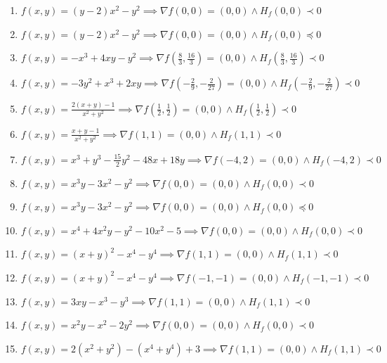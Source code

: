 \documentclass[11pt,a4paper]{article}
\begin{document}
\begin{enumerate}
\item $\displaystyle f(x, y) = (y - 2) x^{2} - y^{2} \implies \nabla f(0, 0) = (0, 0) \land H_{f}(0, 0) \prec 0$
\item $\displaystyle f(x, y) = (y - 2) x^{2} - y^{2} \implies \nabla f(0, 0) = (0, 0) \land H_{f}(0, 0) \preceq 0$
\item $\displaystyle f(x, y) = -x^{3} + 4xy - y^{2} \implies \nabla f\left( \frac{8}{3}, \frac{16}{3} \right) = (0, 0) \land H_{f}\left( \frac{8}{3}, \frac{16}{3} \right) \prec 0$
\item $\displaystyle f(x, y) = -3y^{2} + x^{3} + 2xy \implies \nabla f\left( -\frac{2}{9}, -\frac{2}{27} \right) = (0, 0) \land H_{f}\left( -\frac{2}{9}, -\frac{2}{27} \right) \prec 0$
\item $\displaystyle f(x, y) = \frac{2(x + y) - 1}{x^{2} + y^{2}} \implies \nabla f\left( \frac{1}{2}, \frac{1}{2} \right) = (0, 0) \land H_{f}\left( \frac{1}{2}, \frac{1}{2} \right) \prec 0$
\item $\displaystyle f(x, y) = \frac{x + y - 1}{x^{2} + y^{2}} \implies \nabla f(1, 1) = (0, 0) \land H_{f}(1, 1) \prec 0$
\item $\displaystyle f(x, y) = x^{3} + y^{3} - \frac{15}{2} y^{2} - 48x + 18y \implies \nabla f(-4, 2) = (0, 0) \land H_{f}(-4, 2) \prec 0$
\item $\displaystyle f(x, y) = x^{3} y - 3x^{2} - y^{2} \implies \nabla f(0, 0) = (0, 0) \land H_{f}(0, 0) \prec 0$
\item $\displaystyle f(x, y) = x^{3} y - 3x^{2} - y^{2} \implies \nabla f(0, 0) = (0, 0) \land H_{f}(0, 0) \preceq 0$
\item $\displaystyle f(x, y) = x^{4} + 4x^{2} y - y^{2} - 10x^{2} - 5 \implies \nabla f(0, 0) = (0, 0) \land H_{f}(0, 0) \prec 0$
\item $\displaystyle f(x, y) = (x + y)^{2} - x^{4} - y^{4} \implies \nabla f(1, 1) = (0, 0) \land H_{f}(1, 1) \prec 0$
\item $\displaystyle f(x, y) = (x + y)^{2} - x^{4} - y^{4} \implies \nabla f(-1, -1) = (0, 0) \land H_{f}(-1, -1) \prec 0$
\item $\displaystyle f(x, y) = 3xy - x^{3} - y^{3} \implies \nabla f(1, 1) = (0, 0) \land H_{f}(1, 1) \prec 0$
\item $\displaystyle f(x, y) = x^{2} y - x^{2} - 2y^{2} \implies \nabla f(0, 0) = (0, 0) \land H_{f}(0, 0) \prec 0$
\item $\displaystyle f(x, y) = 2(x^{2} + y^{2}) - (x^{4} + y^{4}) + 3 \implies \nabla f(1, 1) = (0, 0) \land H_{f}(1, 1) \prec 0$

\end{enumerate}
\end{document}
